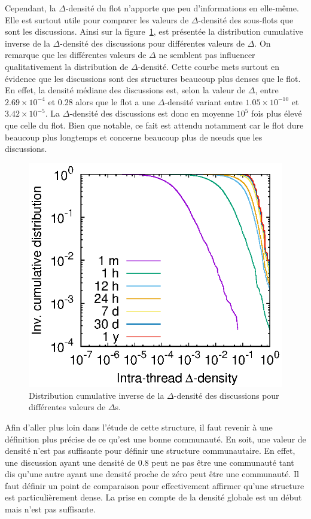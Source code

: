 Cependant, la $\Delta$-densité du flot n'apporte que peu d'informations en elle-même.
Elle est surtout utile pour comparer les valeurs de $\Delta$-densité des sous-flots que sont les discussions.
Ainsi sur la figure~\ref{fig:intra_dens_discussion}, est présentée la distribution cumulative inverse de la $\Delta$-densité des discussions pour différentes valeurs de $\Delta$.
On remarque que les différentes valeurs de $\Delta$ ne semblent pas influencer qualitativement la distribution de $\Delta$-densité.
Cette courbe mets surtout en évidence que les discussions sont des structures beaucoup plus denses que le flot.
En effet, la densité médiane des discussions est, selon la valeur de $\Delta$, entre $2.69 \times 10^{-4}$ et $0.28$ alors que le flot a une $\Delta$-densité variant entre $1.05  \times 10^{-10}$ et $3.42 \times 10^{-5}$.
La $\Delta$-densité des discussions est donc en moyenne $10^{5}$ fois plus élevé que celle du flot.
Bien que notable, ce fait est attendu notamment car le flot dure beaucoup plus longtemps et concerne beaucoup plus de n\oe uds que les discussions.
\begin{figure}
\centering
	\includegraphics[width=0.48\linewidth]{img/mailing/delta.eps}

\caption{Distribution cumulative inverse de la $\Delta$-densité des discussions pour différentes valeurs de $\Delta$s.}
\label{fig:intra_dens_discussion}
\end{figure}

Afin d'aller plus loin dans l'étude de cette structure, il faut revenir à une définition plus précise de ce qu'est une bonne communauté.
En soit, une valeur de densité n'est pas suffisante pour définir une structure communautaire.
En effet, une discussion ayant une densité de $0.8$ peut  ne pas être une communauté tant dis qu'une autre ayant une densité proche de zéro peut être une communauté.
Il faut définir un point de comparaison pour effectivement affirmer qu'une structure est particulièrement dense.
La prise en compte de la densité globale est un début mais n'est pas suffisante.

